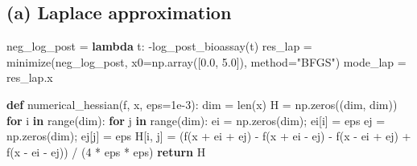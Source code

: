 \documentclass[
  letterpaper,
  DIV=11,
  numbers=noendperiod]{scrartcl}
\newenvironment{Shaded}{\begin{snugshade}}{\end{snugshade}}
\newcommand{\BuiltInTok}[1]{\textcolor[rgb]{0.00,0.23,0.31}{#1}}
\newcommand{\ControlFlowTok}[1]{\textcolor[rgb]{0.00,0.23,0.31}{\textbf{#1}}}
\newcommand{\DecValTok}[1]{\textcolor[rgb]{0.68,0.00,0.00}{#1}}
\newcommand{\FloatTok}[1]{\textcolor[rgb]{0.68,0.00,0.00}{#1}}
\newcommand{\KeywordTok}[1]{\textcolor[rgb]{0.00,0.23,0.31}{\textbf{#1}}}
\newcommand{\NormalTok}[1]{\textcolor[rgb]{0.00,0.23,0.31}{#1}}
\newcommand{\OperatorTok}[1]{\textcolor[rgb]{0.37,0.37,0.37}{#1}}
\newcommand{\StringTok}[1]{\textcolor[rgb]{0.13,0.47,0.30}{#1}}
\begin{document}
\subsection{(a) Laplace approximation}\label{a-laplace-approximation}

\begin{Shaded}
\begin{Highlighting}[]
\NormalTok{neg\_log\_post }\OperatorTok{=} \KeywordTok{lambda}\NormalTok{ t: }\OperatorTok{{-}}\NormalTok{log\_post\_bioassay(t)}
\NormalTok{res\_lap }\OperatorTok{=}\NormalTok{ minimize(neg\_log\_post, x0}\OperatorTok{=}\NormalTok{np.array([}\FloatTok{0.0}\NormalTok{, }\FloatTok{5.0}\NormalTok{]), method}\OperatorTok{=}\StringTok{"BFGS"}\NormalTok{)}
\NormalTok{mode\_lap }\OperatorTok{=}\NormalTok{ res\_lap.x}

\KeywordTok{def}\NormalTok{ numerical\_hessian(f, x, eps}\OperatorTok{=}\FloatTok{1e{-}3}\NormalTok{):}
\NormalTok{    dim }\OperatorTok{=} \BuiltInTok{len}\NormalTok{(x)}
\NormalTok{    H }\OperatorTok{=}\NormalTok{ np.zeros((dim, dim))}
    \ControlFlowTok{for}\NormalTok{ i }\KeywordTok{in} \BuiltInTok{range}\NormalTok{(dim):}
        \ControlFlowTok{for}\NormalTok{ j }\KeywordTok{in} \BuiltInTok{range}\NormalTok{(dim):}
\NormalTok{            ei }\OperatorTok{=}\NormalTok{ np.zeros(dim)}\OperatorTok{;}\NormalTok{ ei[i] }\OperatorTok{=}\NormalTok{ eps}
\NormalTok{            ej }\OperatorTok{=}\NormalTok{ np.zeros(dim)}\OperatorTok{;}\NormalTok{ ej[j] }\OperatorTok{=}\NormalTok{ eps}
\NormalTok{            H[i, j] }\OperatorTok{=}\NormalTok{ (f(x }\OperatorTok{+}\NormalTok{ ei }\OperatorTok{+}\NormalTok{ ej) }\OperatorTok{{-}}\NormalTok{ f(x }\OperatorTok{+}\NormalTok{ ei }\OperatorTok{{-}}\NormalTok{ ej)}
                       \OperatorTok{{-}}\NormalTok{ f(x }\OperatorTok{{-}}\NormalTok{ ei }\OperatorTok{+}\NormalTok{ ej) }\OperatorTok{+}\NormalTok{ f(x }\OperatorTok{{-}}\NormalTok{ ei }\OperatorTok{{-}}\NormalTok{ ej)) }\OperatorTok{/}\NormalTok{ (}\DecValTok{4} \OperatorTok{*}\NormalTok{ eps }\OperatorTok{*}\NormalTok{ eps)}
    \ControlFlowTok{return}\NormalTok{ H}


\end{Highlighting}
\end{Shaded}
\end{document}
